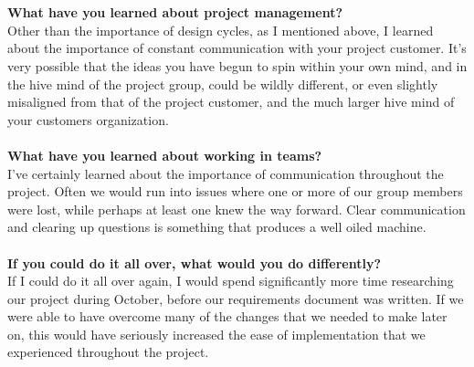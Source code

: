 \documentclass[12pt]{article}
\begin{document}
\\\\
\textbf{What have you learned about project management?}\\
Other than the importance of design cycles, as I mentioned above, I learned about the importance of constant communication with your project customer. It's very possible that the ideas you have begun to spin within your own mind, and in the hive mind of the project group, could be wildly different, or even slightly misaligned from that of the project customer, and the much larger hive mind of your customers organization. 
\\\\
\textbf{What have you learned about working in teams?}\\
I've certainly learned about the importance of communication throughout the project. Often we would run into issues where one or more of our group members were lost, while perhaps at least one knew the way forward. Clear communication and clearing up questions is something that produces a well oiled machine.
\\\\
\textbf{If you could do it all over, what would you do differently?}\\
If I could do it all over again, I would spend significantly more time researching our project during October, before our requirements document was written. If we were able to have overcome many of the changes that we needed to make later on, this would have seriously increased the ease of implementation that we experienced throughout the project.
\\
\pagebreak
\end{document}

